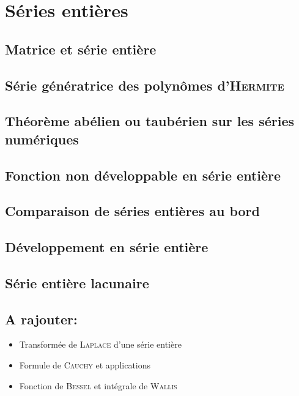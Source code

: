 \chapter{Séries entières}

\section{Matrice et série entière}


\section{Série génératrice des polynômes d'\textsc{Hermite}}


\section{Théorème abélien ou taubérien sur les séries numériques}


\section{Fonction non développable en série entière}


\section{Comparaison de séries entières au bord}


\section{Développement en série entière}


\section{Série entière lacunaire}



\section{A rajouter:}
\begin{itemize}
    \item Transformée de \textsc{Laplace} d'une série entière
    \item Formule de \textsc{Cauchy} et applications
    \item Fonction de \textsc{Bessel} et intégrale de \textsc{Wallis}
\end{itemize}
